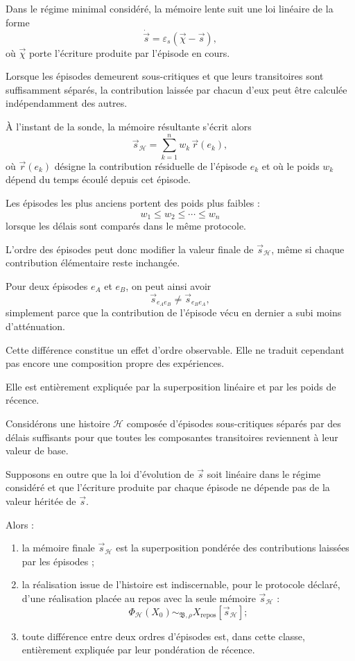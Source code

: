 Dans le régime minimal considéré, la mémoire lente suit une loi linéaire de la forme
\[
\dot{\vec s}
=
\varepsilon_s
\left(
\vec\chi-\vec s
\right),
\]
où $\vec\chi$ porte l'écriture produite par l'épisode en cours.

Lorsque les épisodes demeurent sous-critiques et que leurs transitoires sont suffisamment séparés, la contribution laissée par chacun d'eux peut être calculée indépendamment des autres.

À l'instant de la sonde, la mémoire résultante s'écrit alors
\[
\vec s_{\mathcal H}
=
\sum_{k=1}^{n}
w_k\,\vec r(e_k),
\]
où $\vec r(e_k)$ désigne la contribution résiduelle de l'épisode $e_k$ et où le poids $w_k$ dépend du temps écoulé depuis cet épisode.

Les épisodes les plus anciens portent des poids plus faibles :
\[
w_1\leq w_2\leq\cdots\leq w_n
\]
lorsque les délais sont comparés dans le même protocole.

L'ordre des épisodes peut donc modifier la valeur finale de $\vec s_{\mathcal H}$, même si chaque contribution élémentaire reste inchangée.

Pour deux épisodes $e_A$ et $e_B$, on peut ainsi avoir
\[
\vec s_{e_Ae_B}
\neq
\vec s_{e_Be_A},
\]
simplement parce que la contribution de l'épisode vécu en dernier a subi moins d'atténuation.

Cette différence constitue un effet d'ordre observable. Elle ne traduit cependant pas encore une composition propre des expériences.

Elle est entièrement expliquée par la superposition linéaire et par les poids de récence.

\begin{proposition}
\label{prop:t3-compression-sous-critique}

Considérons une histoire $\mathcal H$ composée d'épisodes sous-critiques séparés par des délais suffisants pour que toutes les composantes transitoires reviennent à leur valeur de base.

Supposons en outre que la loi d'évolution de $\vec s$ soit linéaire dans le régime considéré et que l'écriture produite par chaque épisode ne dépende pas de la valeur héritée de $\vec s$.

Alors :

\begin{enumerate}
\item
  la mémoire finale $\vec s_{\mathcal H}$ est la superposition pondérée
  des contributions laissées par les épisodes ;

\item
    la réalisation issue de l'histoire est indiscernable, pour le protocole déclaré, d'une réalisation placée au repos avec la seule mémoire $\vec s_{\mathcal H}$ :
    \[
    \Phi_{\mathcal H}(X_0)
    \sim_{\mathfrak B,\rho}
    X_{\mathrm{repos}}[\vec s_{\mathcal H}] ;
    \]

\item
  toute différence entre deux ordres d'épisodes est, dans cette classe, entièrement expliquée par leur pondération de récence.
\end{enumerate}
\end{proposition}


